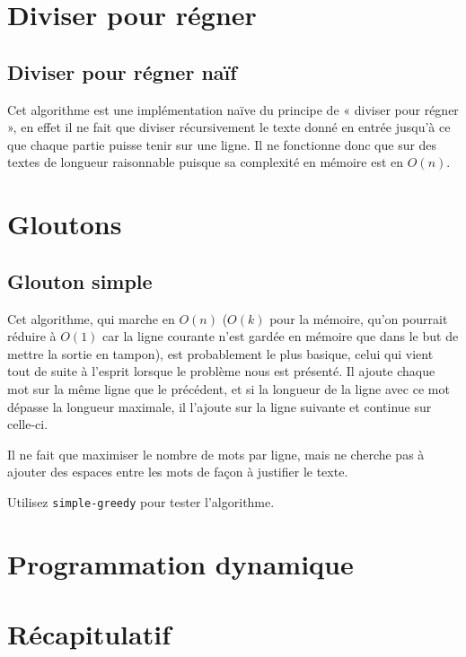 \documentclass{article}
\begin{document}
\section{Diviser pour régner}

\subsection{Diviser pour régner naïf}

Cet algorithme est une implémentation naïve du principe de « diviser pour régner
», en effet il ne fait que diviser récursivement le texte donné en entrée
jusqu'à ce que chaque partie puisse tenir sur une ligne. Il ne fonctionne donc
que sur des textes de longueur raisonnable puisque sa complexité en mémoire est
en $O(n)$. %

\section{Gloutons}

\subsection{Glouton simple}

Cet algorithme, qui marche en $O(n)$ ($O(k)$ pour la mémoire, qu'on pourrait
réduire à $O(1)$ car la ligne courante n'est gardée en mémoire que dans le but
de mettre la sortie en tampon), est probablement le plus basique, celui qui
vient tout de suite à l'esprit lorsque le problème nous est présenté. Il ajoute
chaque mot sur la même ligne que le précédent, et si la longueur de la ligne
avec ce mot dépasse la longueur maximale, il l'ajoute sur la ligne suivante et
continue sur celle-ci.

Il ne fait que maximiser le nombre de mots par ligne, mais ne cherche pas à
ajouter des espaces entre les mots de façon à justifier le texte.

Utilisez \verb|simple-greedy| pour tester l’algorithme.

% 
%

\section{Programmation dynamique}

\section{Récapitulatif}
\end{document}

